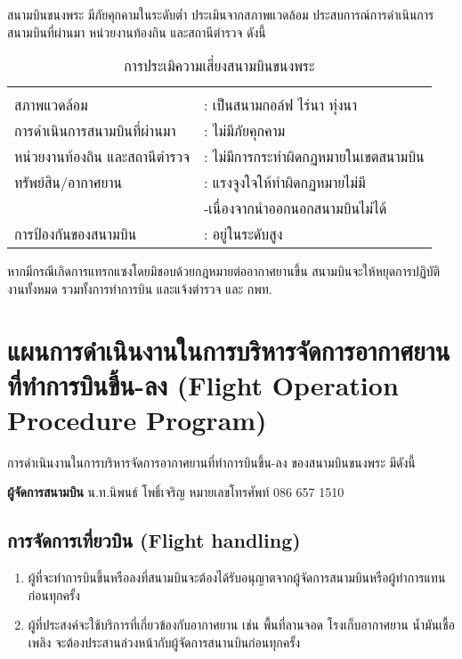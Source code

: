 สนามบินขนงพระ มีภัยคุกคามในระดับต่ำ ประเมินจากสภาพแวดล้อม ประสบการณ์การดำเนินการสนามบินที่ผ่านมา หน่วยงานท้องถิน และสถานีตำรวจ ดังนี้

\begin{table}[ht]
\caption{การประเมิความเสี่ยงสนามบินขนงพระ}
\begin{center}
\begin{tabular}{ll}
& \\
สภาพแวดล้อม & : เป็นสนามกอล์ฟ ไร่นา ทุ่งนา	\\
การดำเนินการสนามบินที่ผ่านมา & : ไม่มีภัยคุกคาม \\
หน่วยงานท้องถิน และสถานีตำรวจ & : ไม่มีการกระทำผิดกฏหมายในเขตสนามบิน \\
ทรัพย์สิน/อากาศยาน & : แรงจูงใจให้ทำผิดกฏหมายไม่มี \\
				& -เนื่องจากนำออกนอกสนามบินไม่ได้ \\
การป้องกันของสนามบิน & : อยู่ในระดับสูง \\
\end{tabular}
\end{center}
\label{การประเมิความเสี่ยงสนามบินขนงพระ}
\end{table}%

หากมีกรณีเกิดการแทรกแซงโดยมิชอบด้วยกฎหมายต่ออากาศยานขึ้น สนามบินจะให้หยุดการปฏิบัติงานทั้งหมด รวมทั้งการทำการบิน และแจ้งตำรวจ และ กพท.

\section{แผนการดำเนินงานในการบริหารจัดการอากาศยานที่ทำการบินขึ้น-ลง (Flight Operation Procedure Program)}

การดำเนินงานในการบริหารจัดการอากาศยานที่ทำการบินขึ้น-ลง ของสนามบินขนงพระ มีดังนี้

\textbf{ผู้จัดการสนามบิน} น.ท.นิพนธ์ โพธิ์เจริญ หมายเลขโทรศัพท์ 086 657 1510

\subsection{การจัดการเที่ยวบิน (Flight handling)}

\begin{enumerate}
\item ผู้ที่จะทำการบินขึ้นหรือลงที่สนามบินจะต้องได้รับอนุญาตจากผู้จัดการสนามบินหรือผู้ทำการแทนก่อนทุกครั้ง
\item ผู้ที่ประสงค์จะใช้บริการที่เกี่ยวข้องกับอากาศยาน เช่น พื้นที่ลานจอด โรงเก็บอากาศยาน น้ำมันเชื้อเพลิง จะต้องประสานล่วงหน้ากับผู้จัดการสนานบินก่อนทุกครั้ง
\end{enumerate}


